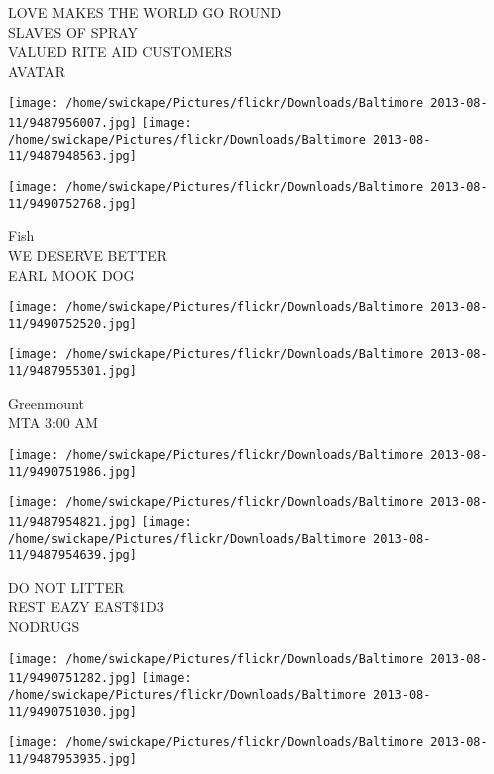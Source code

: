 \documentclass[10pt,letterpaper]{article}
\begin{document}
LOVE MAKES THE WORLD GO ROUND\\
SLAVES OF SPRAY\\
VALUED RITE AID CUSTOMERS\\
AVATAR\\
\pagebreak

\texttt{[image: /home/swickape/Pictures/flickr/Downloads/Baltimore 2013-08-11/9487956007.jpg]}
\texttt{[image: /home/swickape/Pictures/flickr/Downloads/Baltimore 2013-08-11/9487948563.jpg]}

\vspace{0.25in}
\texttt{[image: /home/swickape/Pictures/flickr/Downloads/Baltimore 2013-08-11/9490752768.jpg]}

Fish\\
WE DESERVE BETTER\\
EARL MOOK DOG\\
\pagebreak

\texttt{[image: /home/swickape/Pictures/flickr/Downloads/Baltimore 2013-08-11/9490752520.jpg]}

\vspace{0.25in}
\texttt{[image: /home/swickape/Pictures/flickr/Downloads/Baltimore 2013-08-11/9487955301.jpg]}

Greenmount\\
MTA 3:00 AM\\
\pagebreak

\texttt{[image: /home/swickape/Pictures/flickr/Downloads/Baltimore 2013-08-11/9490751986.jpg]}

\vspace{0.25in}
\texttt{[image: /home/swickape/Pictures/flickr/Downloads/Baltimore 2013-08-11/9487954821.jpg]}
\texttt{[image: /home/swickape/Pictures/flickr/Downloads/Baltimore 2013-08-11/9487954639.jpg]}

DO NOT LITTER\\
REST EAZY EAST\$1D3\\
NODRUGS\\
\pagebreak

\texttt{[image: /home/swickape/Pictures/flickr/Downloads/Baltimore 2013-08-11/9490751282.jpg]}
\texttt{[image: /home/swickape/Pictures/flickr/Downloads/Baltimore 2013-08-11/9490751030.jpg]}

\texttt{[image: /home/swickape/Pictures/flickr/Downloads/Baltimore 2013-08-11/9487953935.jpg]}
\end{document}
